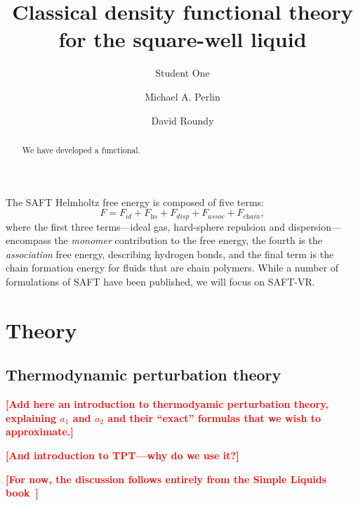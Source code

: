 \documentclass[letterpaper,twocolumn,amsmath,amssymb,pre,aps,10pt]{revtex4-1}
\newcommand\fixme[1]{\textcolor{red}{\textbf{[#1]}}}
\begin{document}
\title{Classical density functional theory for the square-well liquid}

\author{Student One}
\author{Michael A. Perlin}
\author{David Roundy}

\begin{abstract}
  We have developed a functional.
\end{abstract}

\maketitle

The SAFT Helmholtz free energy is composed of five terms:
\begin{equation} \label{eq:SAFT-free-energy}
  F = F_\textit{id} + F_\textit{hs} + F_\textit{disp} +
  F_\textit{assoc} + F_\textit{chain},
\end{equation}
where the first three terms---ideal gas, hard-sphere repulsion and
dispersion---encompass the \emph{monomer} contribution
to the free energy, the fourth is the \emph{association} free energy,
describing hydrogen bonds, and the final term is the chain formation
energy for fluids that are chain polymers.  While a
number of formulations of SAFT have been published, we will focus on
SAFT-VR\cite{gil-villegas-1997-SAFT-VR}.

\newcommand\etadisp{\ensuremath{\eta_\textit{d}}}
\newcommand\epsilondisp{\ensuremath{\epsilon_\textit{d}}}
\newcommand\lambdadisp{\ensuremath{\lambda_\textit{d}}}
\newcommand\lscale{\ensuremath{s_d}}


\section{Theory}

\subsection{Thermodynamic perturbation theory}

\fixme{Add here an introduction to thermodyamic perturbation theory,
  explaining $a_1$ and $a_2$ and their ``exact'' formulas that we wish
  to approximate.}

\fixme{And introduction to TPT---why do we use it?}

\fixme{For now, the discussion follows entirely from the Simple Liquids book~\cite{simple-liquids}}
\end{document}
